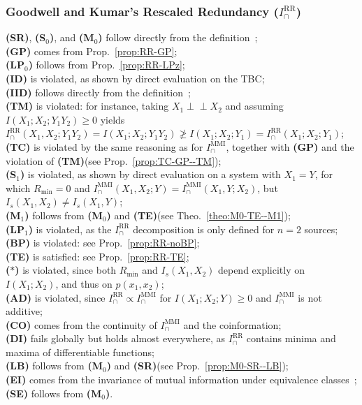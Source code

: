 \documentclass{article}
\newcommand{\ts}[1]{\ensuremath{_{\text{#1}}}}
\newcommand{\ind}{\mathrel{\perp\!\!\!\perp}}
\newcommand{\SR}{\textbf{(SR)}\xspace} %
\newcommand{\Sz}{\textbf{(S\ts{0})}\xspace} %
\newcommand{\Mz}{\textbf{(M\ts{0})}\xspace} %
\newcommand{\GP}{\textbf{(GP)}\xspace} %
\newcommand{\LPz}{\textbf{(LP\ts{0})}\xspace} %
\newcommand{\ID}{\textbf{(ID)}\xspace} %
\newcommand{\IID}{\textbf{(IID)}\xspace} %
\newcommand{\TM}{\textbf{(TM)}\xspace} %
\newcommand{\TC}{\textbf{(TC)}\xspace} %
\newcommand{\So}{\textbf{(S\ts{1})}\xspace} %
\newcommand{\Mo}{\textbf{(M\ts{1})}\xspace} %
\newcommand{\LPo}{\textbf{(LP\ts{1})}\xspace} %
\newcommand{\BP}{\textbf{(BP)}\xspace} %
\newcommand{\TE}{\textbf{(TE)}\xspace} %
\newcommand{\AST}{\textbf{($\boldsymbol{\ast}$)}\xspace} %
\newcommand{\AD}{\textbf{(AD)}\xspace} %
\newcommand{\CO}{\textbf{(CO)}\xspace} %
\newcommand{\LB}{\textbf{(LB)}\xspace} %
\newcommand{\EI}{\textbf{(EI)}\xspace} %
\newcommand{\SE}{\textbf{(SE)}\xspace} %
\newcommand{\DI}{\textbf{(DI)}\xspace}
\newcommand{\IMMI}{\ensuremath{I_\cap^{\text{MMI}}}\xspace}
\newcommand{\IRR}{\ensuremath{I_\cap^{\text{RR}}}\xspace}
\begin{document}
\subsubsection*{Goodwell and Kumar's Rescaled Redundancy ($\IRR$)}
    \SR, \Sz, and \Mz follow directly from the definition~\cite{goodwell2017temporal}; \\
    \GP comes from Prop.~\ref{prop:RR-GP}; \\
    \LPz follows from Prop.~\ref{prop:RR-LPz}; \\
    \ID is violated, as shown by direct evaluation on the TBC; \\
    \IID follows directly from the definition~\cite{goodwell2017temporal}; \\
    \TM is violated: for instance, taking $X_1\ind X_2$ and assuming $I(X_1;X_2;Y_1Y_2)\ge0$ yields
    $\IRR(X_1,X_2;Y_1Y_2)=I(X_1;X_2;Y_1Y_2)\ngeq I(X_1;X_2;Y_1) = \IRR(X_1;X_2;Y_1)$; \\
    \TC is violated by the same reasoning as for $\IMMI$, together with \GP and the violation of \TM (see Prop.~\ref{prop:TC-GP--TM}); \\
    \So is violated, as shown by direct evaluation on a system with $X_1=Y$, for which
    $R_{\min}=0$ and $\IMMI(X_1,X_2;Y)=\IMMI(X_1,Y;X_2)$, but $I_s(X_1,X_2)\ne I_s(X_1,Y)$; \\
    \Mo follows from \Mz and \TE (see Theo.~\ref{theo:M0-TE--M1}); \\
    \LPo is violated, as the $\IRR$ decomposition is only defined for $n=2$ sources; \\
    \BP is violated: see Prop.~\ref{prop:RR-noBP}; \\
    \TE is satisfied: see Prop.~\ref{prop:RR-TE}; \\
    \AST is violated, since both $R_{\min}$ and $I_s(X_1,X_2)$ depend explicitly on $I(X_1;X_2)$, and thus on $p(x_1,x_2)$; \\
    \AD is violated, since $\IRR\propto\IMMI$ for $I(X_1;X_2;Y)\ge0$ and $\IMMI$ is not additive; \\
    \CO comes from the continuity of $\IMMI$ and the coinformation; \\
    \DI fails globally but holds almost everywhere, as \IRR contains minima and maxima of differentiable functions; \\  
    \LB follows from \Mz and \SR (see Prop.~\ref{prop:M0-SR--LB}); \\
    \EI comes from the invariance of mutual information under equivalence classes~\cite{li2011connection}; \\
    \SE follows from \Mz.
    
\end{document}
